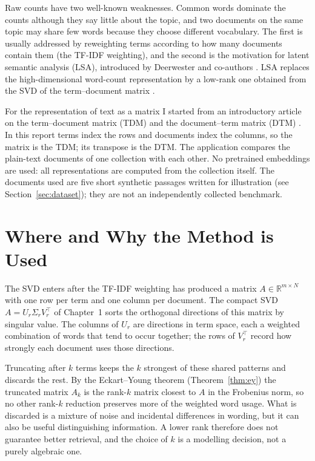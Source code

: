 \documentclass[12pt,a4paper]{report}
\newcommand{\R}{\mathbb{R}}
\newcommand{\T}{^{\top}}
\theoremstyle{plain}
\theoremstyle{definition}
\theoremstyle{remark}
\theoremstyle{definition}
\begin{document}
Raw counts have two well-known weaknesses. Common words dominate the counts although they say little about the topic, and two documents on the same topic may share few words because they choose different vocabulary. The first is usually addressed by reweighting terms according to how many documents contain them (the TF-IDF weighting), and the second is the motivation for latent semantic analysis (LSA), introduced by Deerwester and co-authors \cite{deerwester}. LSA replaces the high-dimensional word-count representation by a low-rank one obtained from the SVD of the term--document matrix  .

For the representation of text as a matrix I started from an introductory article on the term--document matrix (TDM) and the document--term matrix (DTM) \cite{girdher}. In this report terms index the rows and documents index the columns, so the matrix is the TDM; its transpose is the DTM. The application compares the plain-text documents of one collection with each other. No pretrained embeddings are used: all representations are computed from the collection itself. The documents used are five short synthetic passages written for illustration (see Section~\ref{sec:dataset}); they are not an independently collected benchmark.

\section{Where and Why the Method is Used}

The SVD enters after the TF-IDF weighting has produced a matrix $A\in\R^{m\times N}$ with one row per term and one column per document. The compact SVD $A=U_r\Sigma_rV_r\T$ of Chapter~1 sorts the orthogonal directions of this matrix by singular value. The columns of $U_r$ are directions in term space, each a weighted combination of words that tend to occur together; the rows of $V_r\T$ record how strongly each document uses those directions.

Truncating after $k$ terms keeps the $k$ strongest of these shared patterns and discards the rest. By the Eckart--Young theorem (Theorem~\ref{thm:ey}) the truncated matrix $A_k$ is the rank-$k$ matrix closest to $A$ in the Frobenius norm, so no other rank-$k$ reduction preserves more of the weighted word usage. What is discarded is a mixture of noise and incidental differences in wording, but it can also be useful distinguishing information. A lower rank therefore does not guarantee better retrieval, and the choice of $k$ is a modelling decision, not a purely algebraic one.
\end{document}
